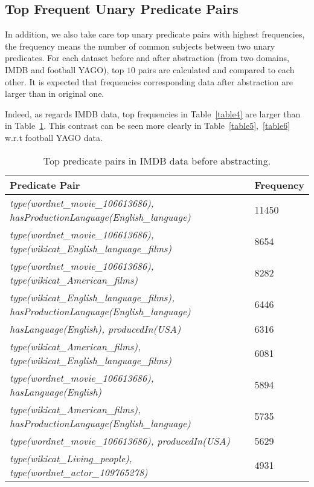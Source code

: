 \subsection{Top Frequent Unary Predicate Pairs}

In addition, we also take care top unary predicate pairs with highest frequencies, the frequency means the number of common subjects between two unary predicates. For each dataset before and after abstraction (from two domains, IMDB and football YAGO), top $10$ pairs are calculated and compared to each other. It is expected that frequencies corresponding data after abstraction are larger than in original one.

Indeed, as regards IMDB data, top frequencies in Table~\ref{table4} are larger than in Table~\ref{table3}. This contrast can be seen more clearly in Table~\ref{table5},~\ref{table6} w.r.t football YAGO data.

\begin{table}
\caption{Top predicate pairs in IMDB data before abstracting.}
\label{table3}
\begin{center}
\begin{tabular}{ |p{6cm}|p{1.5cm}| } 
\hline
Predicate Pair & Frequency\\
\hline
\textit{type(wordnet\_movie\_106613686), hasProductionLanguage(English\_language)} & 11450\\
\hline
\textit{type(wordnet\_movie\_106613686), type(wikicat\_English\_language\_films)} & 8654\\
\hline
\textit{type(wordnet\_movie\_106613686), type(wikicat\_American\_films)} & 8282\\
\hline
\textit{type(wikicat\_English\_language\_films), hasProductionLanguage(English\_language)} & 6446\\
\hline
\textit{hasLanguage(English), producedIn(USA)} & 6316\\
\hline
\textit{type(wikicat\_American\_films), type(wikicat\_English\_language\_films)} & 6081\\
\hline
\textit{type(wordnet\_movie\_106613686), hasLanguage(English)} & 5894\\
\hline
\textit{type(wikicat\_American\_films), hasProductionLanguage(English\_language)} & 5735\\
\hline
\textit{type(wordnet\_movie\_106613686), producedIn(USA)} & 5629\\
\hline
\textit{type(wikicat\_Living\_people), type(wordnet\_actor\_109765278)} & 4931\\
\hline
\end{tabular}
\end{center}
\end{table}

